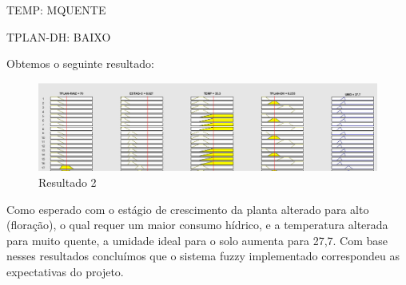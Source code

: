 TEMP: MQUENTE

TPLAN-DH: BAIXO

Obtemos o seguinte resultado:

\begin{figure}[h!]
\centering
\includegraphics[width=1\linewidth]{Resultados/Imagens/resultado2}
\caption{Resultado 2}
\label{fig:resultado2}
\end{figure}

Como esperado com o estágio de crescimento da planta alterado para alto (floração), o qual requer um maior consumo hídrico, e a temperatura alterada para muito quente, a umidade ideal para o solo aumenta para 27,7. Com base nesses resultados concluímos que o sistema fuzzy implementado correspondeu as expectativas do projeto. 
